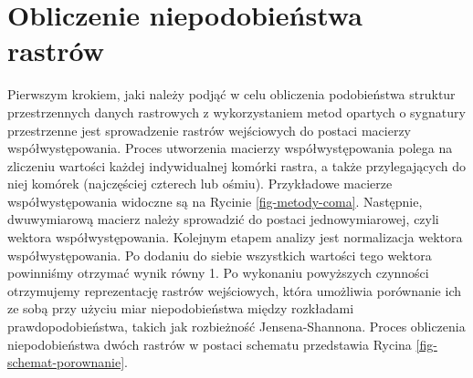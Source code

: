 \documentclass{amuthesis}
\begin{document}
\hypertarget{obliczenie-niepodobieux144stwa-rastruxf3w}{%
\section{Obliczenie niepodobieństwa
rastrów}\label{obliczenie-niepodobieux144stwa-rastruxf3w}}

Pierwszym krokiem, jaki należy podjąć w celu obliczenia podobieństwa
struktur przestrzennych danych rastrowych z wykorzystaniem metod
opartych o sygnatury przestrzenne jest sprowadzenie rastrów wejściowych
do postaci macierzy współwystępowania. Proces utworzenia macierzy
współwystępowania polega na zliczeniu wartości każdej indywidualnej
komórki rastra, a także przylegających do niej komórek (najczęściej
czterech lub ośmiu). Przykładowe macierze współwystępowania widoczne są
na Rycinie \ref{fig-metody-coma}. Następnie, dwuwymiarową macierz należy
sprowadzić do postaci jednowymiarowej, czyli wektora współwystępowania.
Kolejnym etapem analizy jest normalizacja wektora współwystępowania. Po
dodaniu do siebie wszystkich wartości tego wektora powinniśmy otrzymać
wynik równy 1. Po wykonaniu powyższych czynności otrzymujemy
reprezentację rastrów wejściowych, która umożliwia porównanie ich ze
sobą przy użyciu miar niepodobieństwa między rozkładami
prawdopodobieństwa, takich jak rozbieżność Jensena-Shannona. Proces
obliczenia niepodobieństwa dwóch rastrów w postaci schematu przedstawia
Rycina \ref{fig-schemat-porownanie}.
\end{document}
